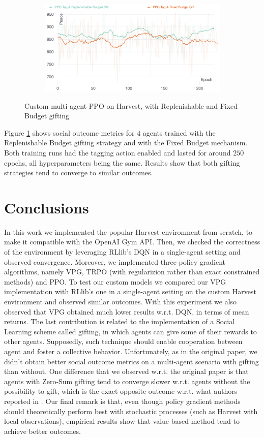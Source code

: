 \documentclass{article}
\begin{document}
\begin{figure}[h]
  \hfill
  \begin{subfigure}[b]{0.3\textwidth}
    \centering
    \includegraphics[width=\textwidth]{../assets/ppo-gifting-fixed-vs-replenishable-peace}
  \end{subfigure}
  \caption{Custom multi-agent PPO on Harvest, with Replenishable and Fixed Budget gifting}
  \label{fig:ppo-gift-replenishable-fixed}
\end{figure}

Figure \ref{fig:ppo-gift-replenishable-fixed} shows social outcome metrics for $4$ agents trained with the Replenishable Budget gifting strategy and with the Fixed Budget mechanism. Both training runs had the tagging action enabled and lasted for around $250$ epochs, all hyperparameters being the same. Results show that both gifting strategies tend to converge to similar outcomes.

\newpage
\section{Conclusions}
In this work we implemented the popular Harvest environment from scratch, to make it compatible with the OpenAI Gym API. Then, we checked the correctness of the environment by leveraging RLlib's DQN in a single-agent setting and observed convergence. Moreover, we implemented three policy gradient algorithms, namely VPG, TRPO (with regularizion rather than exact constrained methods) and PPO. To test our custom models we compared our VPG implementation with RLlib's one in a single-agent setting on the custom Harvest environment and observed similar outcomes. With this experiment we also observed that VPG obtained much lower results w.r.t. DQN, in terms of mean returns. The last contribution is related to the implementation of a Social Learning scheme called gifting, in which agents can give some of their rewards to other agents. Supposedly, such technique should enable cooperation between agent and foster a collective behavior. Unfortunately, as in the original paper, we didn't obtain better social outcome metrics on a multi-agent scenario with gifting than without. One difference that we observed w.r.t. the original paper is that agents with Zero-Sum gifting tend to converge slower w.r.t. agents without the possibility to gift, which is the exact opposite outcome w.r.t. what authors reported in \cite{gifting}. Our final remark is that, even though policy gradient methods should theoretically perform best with stochastic processes (such as Harvest with local observations), empirical results show that value-based method tend to achieve better outcomes.
\end{document}
